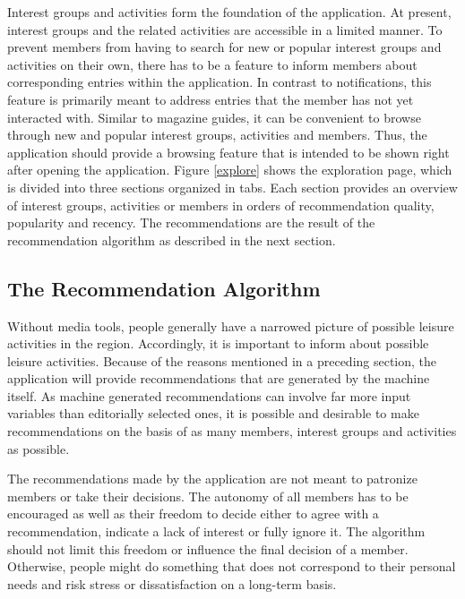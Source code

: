 \documentclass[12pt,numbers=noenddot,parskip,bibliography=totocnumbered,listof=totocnumbered,draft]{scrreprt}
\begin{document}
Interest groups and activities form the foundation of the application. At present, interest groups and the related activities are accessible in a limited manner. To prevent members from having to search for new or popular interest groups and activities on their own, there has to be a feature to inform members about corresponding entries within the application. In contrast to notifications, this feature is primarily meant to address entries that the member has not yet interacted with. Similar to magazine guides, it can be convenient to browse through new and popular interest groups, activities and members. Thus, the application should provide a browsing feature that is intended to be shown right after opening the application. Figure \ref{explore} shows the exploration page, which is divided into three sections organized in tabs. Each section provides an overview of interest groups, activities or members in orders of recommendation quality, popularity and recency. The recommendations are the result of the recommendation algorithm as described in the next section.

\subsection{The Recommendation Algorithm}
Without media tools, people generally have a narrowed picture of possible leisure activities in the region. Accordingly, it is important to inform about possible leisure activities. Because of the reasons mentioned in a preceding section, the application will provide recommendations that are generated by the machine itself. As machine generated recommendations can involve far more input variables than editorially selected ones, it is possible and desirable to make recommendations on the basis of as many members, interest groups and activities as possible.

The recommendations made by the application are not meant to patronize members or take their decisions. The autonomy of all members has to be encouraged as well as their freedom to decide either to agree with a recommendation, indicate a lack of interest or fully ignore it. The algorithm should not limit this freedom or influence the final decision of a member. Otherwise, people might do something that does not correspond to their personal needs and risk stress or dissatisfaction on a long-term basis.
\end{document}
